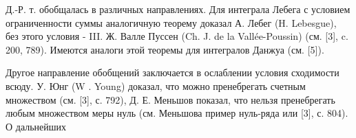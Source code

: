 \documentclass[10pt]{article}
\begin{document}
Д.-Р. т. обобщалась в различных направлениях. Для интеграла Лебега с условием ограниченности суммы аналогичную теорему доказал А. Лебег (H. Lebesgue), без этого условия - III. Ж. Валле Пуссен (Ch. J. de la Vallée-Poussin) (см. [3], c. 200, 789). Имеются аналоги этой теоремы для интегралов Данжуа (см. [5]).



Другое направление обобщений заключается в ослаблении условия сходимости всюду. У. Юнг (W . Young) доказал, что можно пренебрегать счетным множеством (см. [3], с. 792), Д. Е. Меньшов показал, что нельзя пренебрегать любым множеством меры нуль (см. Меньшова пример нуль-ряда или [3], с. 804). О дальнейших
\end{document}
